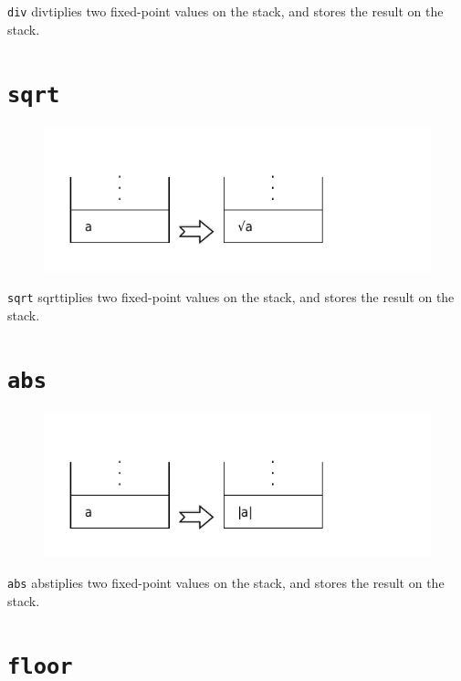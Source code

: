 		\texttt{div} divtiplies two fixed-point values on the stack, and stores
		the result on the stack.

\section*{\texttt{sqrt}}

	\begin{figure}
		\begin{flushright}
			\includegraphics[width=0.9\linewidth]{figure/pdf/i_sqrt} 
		\end{flushright}
	\end{figure}

		\texttt{sqrt} sqrttiplies two fixed-point values on the stack, and stores
		the result on the stack.

\section*{\texttt{abs}}

	\begin{figure}
		\begin{flushright}
			\includegraphics[width=0.9\linewidth]{figure/pdf/i_abs} 
		\end{flushright}
	\end{figure}

		\texttt{abs} abstiplies two fixed-point values on the stack, and stores
		the result on the stack.

\section*{\texttt{floor}}


